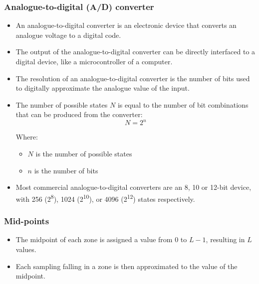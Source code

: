 \documentclass[11pt]{article}
\begin{document}
\subsubsection{Analogue-to-digital (A/D) converter}
\label{sec:orgc456a28}
\begin{itemize}
\item An analogue-to-digital converter is an electronic device that converts an analogue voltage to a digital code.
\item The output of the analogue-to-digital converter can be directly interfaced to a digital device, like a microcontroller of a computer.
\item The resolution of an analogue-to-digital converter is the number of bits used to digitally approximate the analogue value of the input.
\item The number of possible states \(N\) is equal to the number of bit combinations that can be produced from the converter:
\[N = 2^n\]

Where:
\begin{itemize}
\item \(N\) is the number of possible states
\item \(n\) is the number of bits
\end{itemize}

\item Most commercial analogue-to-digital converters are an 8, 10 or 12-bit device, with 256 (2\textsuperscript{8}), 1024 (2\textsuperscript{10}), or 4096 (2\textsuperscript{12}) states respectively.
\end{itemize}
\subsubsection{Mid-points}
\label{sec:org5a984e4}
\begin{itemize}
\item The midpoint of each zone is assigned a value from 0 to \(L - 1\), resulting in \(L\) values.
\item Each sampling falling in a zone is then approximated to the value of the midpoint.
\end{itemize}

 \newpage
\end{document}
